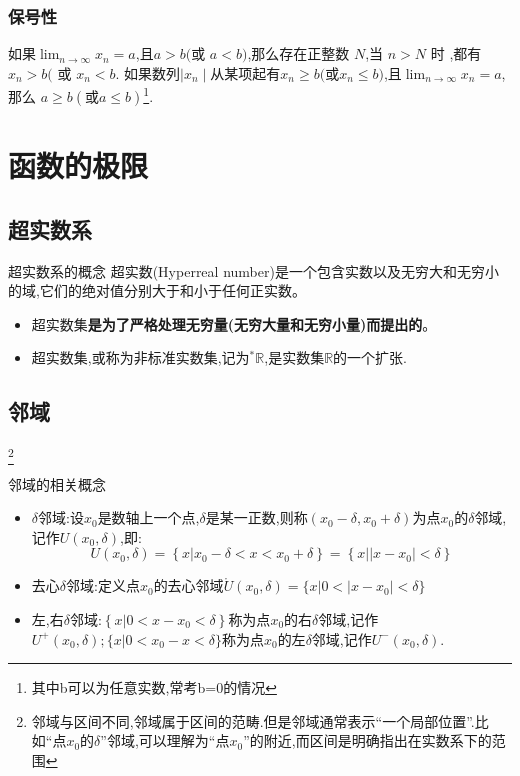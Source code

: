 \documentclass[12pt, a4paper, oneside, UTF8]{ctexbook}
\begin{document}
\begin{sloppypar}
    \subsubsection{保号性}
    \begin{them}{}{}
        如果$\lim_{n\to\infty}x_n=a$,且$a{>}b( $或 $a{<}b)$,那么存在正整数 $N$,当 $n{>}N$ 时 ,都有$x_n{>}b($ 或 $x_n{<}b$.\newline
        如果数列$\mid x_n\mid$从某项起有$x_n\geqslant b($或$x_n\leqslant b)$,且$\lim_{n\to\infty}x_n=a $,那么 $a\geqslant b( 或 a\leqslant b)$\footnote{其中b可以为任意实数,常考b=0的情况}.
    \end{them}
    \section{函数的极限}
    \subsection{超实数系}
    \begin{defn}{超实数系的概念}{}
        超实数(Hyperreal number)是一个包含实数以及无穷大和无穷小的域,它们的绝对值分别大于和小于任何正实数。
    \end{defn}
    \begin{criterion}{}{}
        \begin{itemize}
            \item 超实数集\textbf{是为了严格处理无穷量(无穷大量和无穷小量)而提出的}。
            \item 超实数集,或称为非标准实数集,记为$^{*}\mathbb{R}$,是实数集$\mathbb{R}$的一个扩张.
        \end{itemize}
    \end{criterion}
    \subsection{邻域}\footnote{邻域与区间不同,邻域属于区间的范畴.但是邻域通常表示“一个局部位置”.比如“点$x_0$的$\delta$”邻域,可以理解为“点$x_0$”的附近,而区间是明确指出在实数系下的范围}
    \begin{defn}{邻域的相关概念}{}
        \begin{itemize}
            \item $\delta$邻域:设$x_0$是数轴上一个点,$\delta$是某一正数,则称$(x_{0}-\delta,x_{0}+\delta)$为点$x_0$的$\delta$邻域,记作$U(x_{0},\delta)$,即:
                  $$
                      U(x_{0},\delta)=\left\{x|x_{0}-\delta<x<x_{0}+\delta\right\}=\left\{\left.x\right|\left|\left.x-x_{0}\right|<\delta\right\}\right.
                  $$
            \item 去心$\delta$邻域:定义点$x_0$的去心邻域$\mathring{U}(x_{0},\delta)=\bigl\{x|0<\bigl|x-x_{0}\bigr|<\delta\bigr\}$
            \item 左,右$\delta$邻域:$\left\{x|0<x-x_{0}<\delta\right\}$称为点$x_0$的右$\delta$邻域,记作$U^{+}(x_{0},\delta);\{x|0<x_{0}-x<\delta\}$称为点$x_0$的左$\delta$邻域,记作$U^{-}(x_{0},\delta).$
        \end{itemize}
    \end{defn}

\end{sloppypar}
\end{document}
